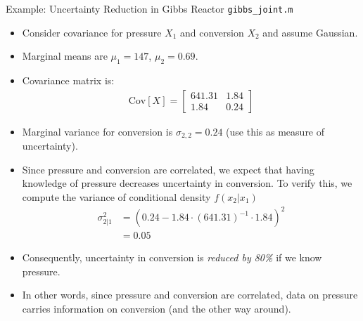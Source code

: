 \documentclass[9pt]{beamer}
\begin{document}
%
\begin{frame}{Example: Uncertainty Reduction in Gibbs Reactor \footnotesize{\texttt{gibbs\_joint.m}}}

\begin{itemize}
\setlength{\itemsep}{5pt}
\item Consider covariance for pressure $X_1$ and conversion $X_2$ and assume Gaussian.
\item Marginal means are $\mu_1=147$, $\mu_2=0.69$.
\item Covariance matrix is:
\begin{align*}
\textrm{Cov}[X]=\left[\begin{array}{cc}  641.31    &      1.84\\
          1.84     &     0.24\end{array}\right]
\end{align*}
\item Marginal variance for conversion is $\sigma_{2,2}=0.24$ (use this as measure of uncertainty).

\item Since pressure and conversion are correlated, we expect that having knowledge of pressure decreases uncertainty in  conversion. To verify this, we compute the variance of conditional density $f(x_2|x_1)$
\begin{align*}
\sigma_{2|1}^2&=(0.24-1.84\cdot (641.31)^{-1}\cdot 1.84)^2\\
&=0.05
\end{align*}
\item Consequently, uncertainty in conversion is {\em reduced by 80\%} if we know pressure.  
\item In other words,  since pressure and conversion are correlated, data on pressure carries information on conversion (and the other way around). 

\end{itemize}

\end{frame}
\end{document}
